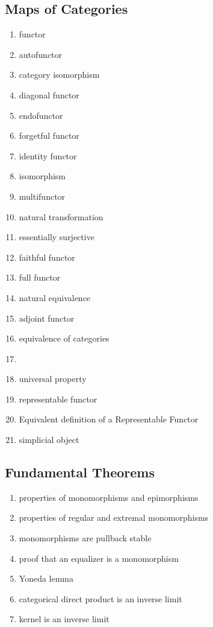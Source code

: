 \documentclass[12pt]{article}
\begin{document}
\begin{multicols}{2}
\subsection{Maps of Categories}
\begin{enumerate}
\item functor
\item autofunctor
\item category isomorphism
\item diagonal functor 
\item endofunctor
\item forgetful functor 
\item identity functor
\item isomorphism
\item multifunctor
\item natural transformation
\item essentially surjective
\item faithful functor
\item full functor
\item natural equivalence
\item adjoint functor
\item equivalence of categories
\item {}
\item universal property
\item representable functor
\item Equivalent definition of a Representable Functor 
\item simplicial object
\end{enumerate}

\subsection{Fundamental Theorems}
\begin{enumerate}
\item properties of monomorphisms and epimorphisms
\item properties of regular and extremal monomorphisms
\item monomorphisms are pullback stable
\item proof that an equalizer is a monomorphism
\item Yoneda lemma
\item categorical direct product is an inverse limit
\item kernel is an inverse limit
\end{enumerate}


\end{multicols}
\end{document}
